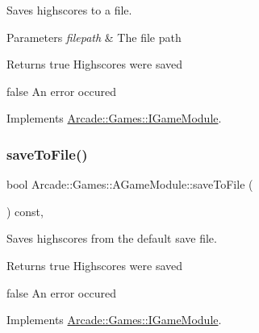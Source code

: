 Saves highscores to a file. 


\begin{DoxyParams}{Parameters}
{\em filepath} & The file path \\
\hline
\end{DoxyParams}
\begin{DoxyReturn}{Returns}
true Highscores were saved 

false An error occured 
\end{DoxyReturn}


Implements \mbox{\hyperlink{classArcade_1_1Games_1_1IGameModule_a3cf053ce2f4ccfe13e9c10d8549f7c82}{Arcade\+::\+Games\+::\+I\+Game\+Module}}.

\mbox{\label{classArcade_1_1Games_1_1AGameModule_a82fdd06480edd7f727504f5073730812}} 
\subsubsection{\texorpdfstring{saveToFile()}{saveToFile()}\hspace{0.1cm}{\footnotesize\ttfamily [2/2]}}
{\footnotesize\ttfamily bool Arcade\+::\+Games\+::\+A\+Game\+Module\+::save\+To\+File (\begin{DoxyParamCaption}{ }\end{DoxyParamCaption}) const\hspace{0.3cm}{\ttfamily [final]}, {\ttfamily [virtual]}}



Saves highscores from the default save file. 

\begin{DoxyReturn}{Returns}
true Highscores were saved 

false An error occured 
\end{DoxyReturn}


Implements \mbox{\hyperlink{classArcade_1_1Games_1_1IGameModule_ada0aa1d3d52bcdedcdb35b95d956c8ee}{Arcade\+::\+Games\+::\+I\+Game\+Module}}.

\mbox{\label{classArcade_1_1Games_1_1AGameModule_abdbf4cf008033b5f339d9758d7f2b8a2}} 
